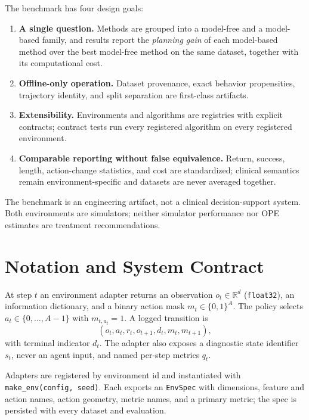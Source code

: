 \documentclass[10pt,twocolumn]{article}
\newcommand{\code}[1]{\texttt{#1}}
\newcommand{\R}{\mathbb{R}}
\begin{document}
The benchmark has four design goals:
\begin{enumerate}
    \item \textbf{A single question.} Methods are grouped into a model-free and a model-based family, and results report the \emph{planning gain} of each model-based method over the best model-free method on the same dataset, together with its computational cost.
    \item \textbf{Offline-only operation.} Dataset provenance, exact behavior propensities, trajectory identity, and split separation are first-class artifacts.
    \item \textbf{Extensibility.} Environments and algorithms are registries with explicit contracts; contract tests run every registered algorithm on every registered environment.
    \item \textbf{Comparable reporting without false equivalence.} Return, success, length, action-change statistics, and cost are standardized; clinical semantics remain environment-specific and datasets are never averaged together.
\end{enumerate}

The benchmark is an engineering artifact, not a clinical decision-support system. Both environments are simulators; neither simulator performance nor OPE estimates are treatment recommendations.

\section{Notation and System Contract}
\label{sec:contract}

At step $t$ an environment adapter returns an observation $o_t\in\R^{d}$ (\code{float32}), an information dictionary, and a binary action mask $m_t\in\{0,1\}^{A}$. The policy selects $a_t\in\{0,\ldots,A-1\}$ with $m_{t,a_t}=1$. A logged transition is
\begin{equation}
    (o_t, a_t, r_t, o_{t+1}, d_t, m_t, m_{t+1}),
\end{equation}
with terminal indicator $d_t$. The adapter also exposes a diagnostic state identifier $s_t$, never an agent input, and named per-step metrics $q_t$.

Adapters are registered by environment id and instantiated with \code{make\_env(config, seed)}. Each exports an \code{EnvSpec} with dimensions, feature and action names, action geometry, metric names, and a primary metric; the spec is persisted with every dataset and evaluation.
\end{document}
